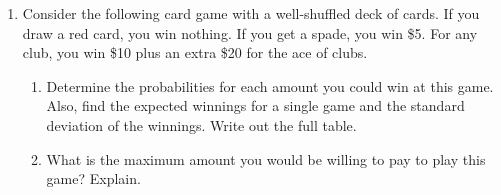 \documentclass[10pt]{article}\usepackage[]{graphicx}\usepackage[]{color}
\newcommand{\Ex}{\mathbb{E}}
\begin{document}
\begin{enumerate}
  \itemsep0.75in
  

    \item Consider the following card game with a well-shuffled deck of cards. If you draw a red card, you win nothing. If you get a spade, you win \$5. For any club, you win \$10 plus an extra \$20 for the ace of clubs.
\begin{enumerate}
\item Determine the probabilities for each amount you could win at this game. Also, find the expected winnings for a single game and the standard deviation of the winnings. Write out the full table. 
\item What is the maximum amount you would be willing to pay to play this game? Explain.
\end{enumerate}



\end{enumerate}
\end{document}
